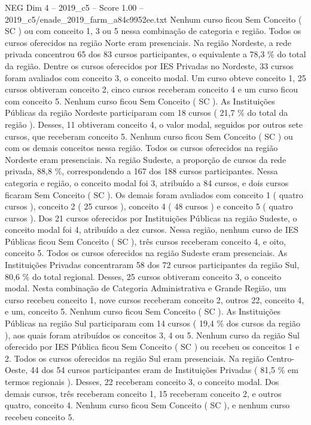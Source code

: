 \begin{textsample}{NEG Dim 4 – 2019\_c5 – Score 1.00 – 2019\_c5/enade\_2019\_farm\_a84c9952ee.txt}
Nenhum curso ficou Sem Conceito ( SC ) ou com conceito 1, 3 ou 5 nessa combinação de categoria e região.
Todos os cursos oferecidos na região Norte eram presenciais.
Na região Nordeste, a rede privada concentrou 65 dos 83 cursos participantes, o equivalente a 78,3 \% do total da região.
Dentre os cursos oferecidos por IES Privadas no Nordeste, 33 cursos foram avaliados com conceito 3, o conceito modal.
Um curso obteve conceito 1, 25 cursos obtiveram conceito 2, cinco cursos receberam conceito 4 e um curso ficou com conceito 5.
Nenhum curso ficou Sem Conceito ( SC ).
As Instituições Públicas da região Nordeste participaram com 18 cursos ( 21,7 \% do total da região ).
Desses, 11 obtiveram conceito 4, o valor modal, seguidos por outros sete cursos, que receberam conceito 5.
Nenhum curso ficou Sem Conceito ( SC ) ou com os demais conceitos nessa região.
Todos os cursos oferecidos na região Nordeste eram presenciais.
Na região Sudeste, a proporção de cursos da rede privada, 88,8 \%, correspondendo a 167 dos 188 cursos participantes.
Nessa categoria e região, o conceito modal foi 3, atribuído a 84 cursos, e dois cursos ficaram Sem Conceito ( SC ).
Os demais foram avaliados com conceito 1 ( quatro cursos ), conceito 2 ( 25 cursos ), conceito 4 ( 48 cursos ) e conceito 5 ( quatro cursos ).
Dos 21 cursos oferecidos por Instituições Públicas na região Sudeste, o conceito modal foi 4, atribuído a dez cursos.
Nessa região, nenhum curso de IES Públicas ficou Sem Conceito ( SC ), três cursos receberam conceito 4, e oito, conceito 5.
Todos os cursos oferecidos na região Sudeste eram presenciais.
As Instituições Privadas concentraram 58 dos 72 cursos participantes da região Sul, 80,6 \% do total regional.
Desses, 25 cursos obtiveram conceito 3, o conceito modal.
Nesta combinação de Categoria Administrativa e Grande Região, um curso recebeu conceito 1, nove cursos receberam conceito 2, outros 22, conceito 4, e um, conceito 5.
Nenhum curso ficou Sem Conceito ( SC ).
As Instituições Públicas na região Sul participaram com 14 cursos ( 19,4 \% dos cursos da região ), aos quais foram atribuídos os conceitos 3, 4 ou 5.
Nenhum curso da região Sul oferecido por IES Pública ficou Sem Conceito ( SC ) ou recebeu os conceitos 1 e 2.
Todos os cursos oferecidos na região Sul eram presenciais.
Na região Centro-Oeste, 44 dos 54 cursos participantes eram de Instituições Privadas ( 81,5 \% em termos regionais ).
Desses, 22 receberam conceito 3, o conceito modal.
Dos demais cursos, três receberam conceito 1, 15 receberam conceito 2, e outros quatro, conceito 4.
Nenhum curso ficou Sem Conceito ( SC ), e nenhum curso recebeu conceito 5.

\end{textsample}
